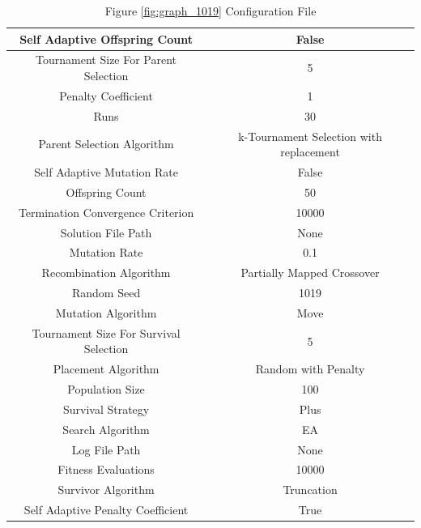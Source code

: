 \documentclass{standalone}
\begin{document}
\begin{table}[!htb]
	\centering
	\caption{Figure \ref{fig:graph_1019} Configuration File}
	\label{tab:graph_1019}
	\begin{tabular}{| c | c |}
		\hline
		Self Adaptive Offspring Count		& False		 \\
		\hline
		Tournament Size For Parent Selection		& 5		 \\
		\hline
		Penalty Coefficient		& 1		 \\
		\hline
		Runs		& 30		 \\
		\hline
		Parent Selection Algorithm		& k-Tournament Selection with replacement		 \\
		\hline
		Self Adaptive Mutation Rate		& False		 \\
		\hline
		Offspring Count		& 50		 \\
		\hline
		Termination Convergence Criterion		& 10000		 \\
		\hline
		Solution File Path		& None		 \\
		\hline
		Mutation Rate		& 0.1		 \\
		\hline
		Recombination Algorithm		& Partially Mapped Crossover		 \\
		\hline
		Random Seed		& 1019		 \\
		\hline
		Mutation Algorithm		& Move		 \\
		\hline
		Tournament Size For Survival Selection		& 5		 \\
		\hline
		Placement Algorithm		& Random with Penalty		 \\
		\hline
		Population Size		& 100		 \\
		\hline
		Survival Strategy		& Plus		 \\
		\hline
		Search Algorithm		& EA		 \\
		\hline
		Log File Path		& None		 \\
		\hline
		Fitness Evaluations		& 10000		 \\
		\hline
		Survivor Algorithm		& Truncation		 \\
		\hline
		Self Adaptive Penalty Coefficient		& True		 \\
		\hline
	\end{tabular}
\end{table}
\end{document}
